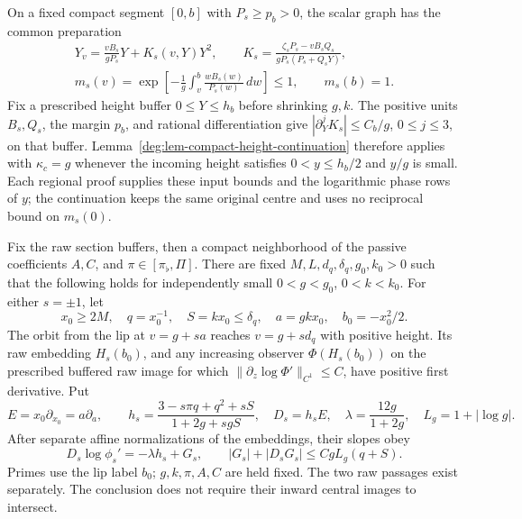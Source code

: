 On a fixed compact segment \([0,b]\) with \(P_s\ge p_b>0\),
the scalar graph has the common preparation
\begin{equation}\label{deg:positive-large-S-inward-compact-graph}
 \begin{gathered}
 Y_v=\frac{vB_s}{gP_s}Y+K_s(v,Y)Y^2,\qquad
 K_s=\frac{\zeta_sP_s-vB_sQ_s}{gP_s(P_s+Q_sY)},\\
 m_s(v)=\exp\left[-\frac1g\int_v^b\frac{wB_s(w)}{P_s(w)}\,dw\right]
 \le1,\qquad m_s(b)=1 .
 \end{gathered}
\end{equation}
Fix a prescribed height buffer \(0\le Y\le h_b\) before shrinking
\(g,k\). The positive units \(B_s,Q_s\), the margin \(p_b\), and
rational differentiation give
\( |\partial_Y^jK_s|\le C_b/g\), \(0\le j\le3\), on that buffer.
Lemma~\ref{deg:lem-compact-height-continuation} therefore applies with
\(\kappa_c=g\) whenever the incoming height satisfies
\(0<y\le h_b/2\) and \(y/g\) is small. Each regional proof supplies
these input bounds and the logarithmic phase rows of \(y\); the
continuation keeps the same original centre and uses no reciprocal
bound on \(m_s(0)\).

\begin{lemma}\label{deg:lem-quadratic-outer-jets}
Fix the raw section buffers, then a compact neighborhood of the passive
coefficients \(A,C\), and \(\pi\in[\pi_\flat,\Pi]\).
There are fixed \(M,L,d_q,\delta_q,g_0,k_0>0\) such that the following
holds for independently small \(0<g<g_0\), \(0<k<k_0\).
For either \(s=\pm1\), let
\[
 x_0\ge2M,\quad q=x_0^{-1},\quad S=kx_0\le\delta_q,
 \quad a=gkx_0,\quad b_0=-x_0^2/2 .
\]
The orbit from the lip at \(v=g+sa\) reaches \(v=g+sd_q\)
with positive height. Its raw embedding \(H_s(b_0)\), and any increasing
observer \(\Phi(H_s(b_0))\) on the prescribed buffered raw image for which
\(\|\partial_z\log\Phi'\|_{C^1}\le C\), have positive first derivative. Put
\[
 E=x_0\partial_{x_0}=a\partial_a,\qquad
 h_s=\frac{3-s\pi q+q^2+sS}{1+2g+sgS},\quad D_s=h_sE,
 \quad\lambda=\frac{12g}{1+2g},\quad L_g=1+|\log g|.
\]
After separate affine normalizations of the embeddings, their slopes obey
\begin{equation}\label{deg:quadratic-outer-weighted-jets}
 D_s\log\phi_s'=-\lambda h_s+G_s,
 \qquad |G_s|+|D_sG_s|\le CgL_g(q+S).
\end{equation}
Primes use the lip label \(b_0\); \(g,k,\pi,A,C\) are held fixed.
The two raw passages exist separately. The conclusion does not require
their inward central images to intersect.
\end{lemma}

